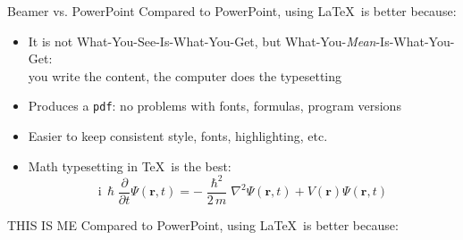 \documentclass{beamer}
\begin{document}
\begin{frame}{Beamer vs. PowerPoint}
    Compared to PowerPoint, using \LaTeX\ is better because:
    \begin{itemize}
        \item It is not What-You-See-Is-What-You-Get, but
              What-You-\emph{Mean}-Is-What-You-Get:\\
              you write the content, the computer does the typesetting
        \item Produces a \texttt{pdf}: no problems with fonts, formulas,
              program versions
        \item Easier to keep consistent style, fonts, highlighting, etc.
        \item Math typesetting in \TeX\ is the best:
              \begin{equation*}
                  \mathrm{i}\,\hslash\frac{\partial}{\partial t} \Psi(\mathbf{r},t) =
                  -\frac{\hslash^2}{2\,m}\nabla^2\Psi(\mathbf{r},t)
                  + V(\mathbf{r})\Psi(\mathbf{r},t)
              \end{equation*}

    \end{itemize}
\end{frame}

\begin{frame}{THIS IS ME}
    Compared to PowerPoint, using \LaTeX\ is better because:
    \begin{center}
    \end{center}

\end{frame}

\end{document}
